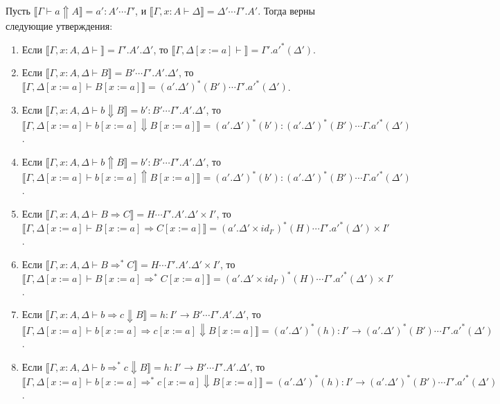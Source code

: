 \documentclass{amsart}
\theoremstyle{definition}
\theoremstyle{remark}
\newcommand{\red}{\Rightarrow}
\renewcommand{\ll}{\llbracket}
\newcommand{\rr}{\rrbracket}
\numberwithin{figure}{section}
\begin{document}
\begin{lem}
Пусть $\ll \Gamma \vdash a \Uparrow A \rr = a' : A' \dotsb \Gamma'$, и $\ll \Gamma, x : A \vdash \Delta \rr = \Delta' \dotsb \Gamma'.A'$.
Тогда верны следующие утверждения:
\begin{enumerate}
\item Если $\ll \Gamma, x : A, \Delta \vdash \rr = \Gamma'.A'.\Delta'$, то $\ll \Gamma, \Delta[x := a] \vdash \rr = \Gamma'.a'^*(\Delta')$.
\item Если $\ll \Gamma, x : A, \Delta \vdash B \rr = B' \dotsb \Gamma'.A'.\Delta'$, то $\ll \Gamma, \Delta[x := a] \vdash B[x := a] \rr = (a'.\Delta')^*(B') \dotsb \Gamma'.a'^*(\Delta')$.
\item Если $\ll \Gamma, x : A, \Delta \vdash b \Downarrow B \rr = b' : B' \dotsb \Gamma'.A'.\Delta'$, то $\ll \Gamma, \Delta[x := a] \vdash b[x := a] \Downarrow B[x := a] \rr = (a'.\Delta')^*(b') : (a'.\Delta')^*(B') \dotsb \Gamma.a'^*(\Delta')$.
\item Если $\ll \Gamma, x : A, \Delta \vdash b \Uparrow B \rr = b' : B' \dotsb \Gamma'.A'.\Delta'$, то $\ll \Gamma, \Delta[x := a] \vdash b[x := a] \Uparrow B[x := a] \rr = (a'.\Delta')^*(b') : (a'.\Delta')^*(B') \dotsb \Gamma.a'^*(\Delta')$.
\item Если $\ll \Gamma, x : A, \Delta \vdash B \red C \rr = H \dotsb \Gamma'.A'.\Delta' \times I'$, то $\ll \Gamma, \Delta[x := a] \vdash B[x := a] \red C[x := a] \rr = (a'.\Delta' \times id_{I'})^*(H) \dotsb \Gamma'.a'^*(\Delta') \times I'$.
\item Если $\ll \Gamma, x : A, \Delta \vdash B \red^* C \rr = H \dotsb \Gamma'.A'.\Delta' \times I'$, то $\ll \Gamma, \Delta[x := a] \vdash B[x := a] \red^* C[x := a] \rr = (a'.\Delta' \times id_{I'})^*(H) \dotsb \Gamma'.a'^*(\Delta') \times I'$.
\item Если $\ll \Gamma, x : A, \Delta \vdash b \red c \Downarrow B \rr = h : I' \to B' \dotsb \Gamma'.A'.\Delta'$, то $\ll \Gamma, \Delta[x := a] \vdash b[x := a] \red c[x := a] \Downarrow B[x := a] \rr = (a'.\Delta')^*(h) : I' \to (a'.\Delta')^*(B') \dotsb \Gamma'.a'^*(\Delta')$.
\item Если $\ll \Gamma, x : A, \Delta \vdash b \red^* c \Downarrow B \rr = h : I' \to B' \dotsb \Gamma'.A'.\Delta'$, то $\ll \Gamma, \Delta[x := a] \vdash b[x := a] \red^* c[x := a] \Downarrow B[x := a] \rr = (a'.\Delta')^*(h) : I' \to (a'.\Delta')^*(B') \dotsb \Gamma'.a'^*(\Delta')$.
\end{enumerate}
\end{lem}
\end{document}
